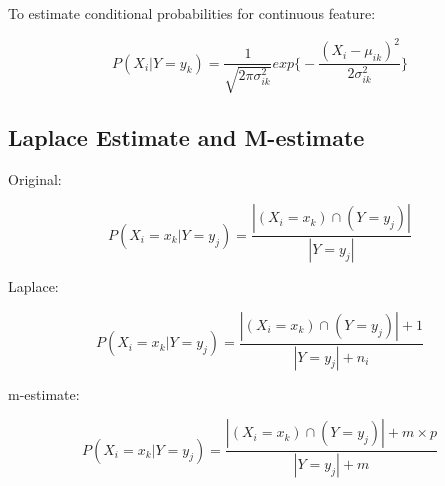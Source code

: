 \begin{multicols}{2}
\noindent To estimate conditional probabilities for continuous feature:

$$P(X_{i}| Y=y_{k}) = \frac{1}{\sqrt{2 \pi \sigma^{2}_{ik}}} exp \bigg\{ - \frac{(X_{i} - \mu_{ik})^{2} }{2 \sigma^{2}_{ik}} \bigg\}$$

\subsection{Laplace Estimate and M-estimate}

\noindent Original:

$$P(X_{i} = x_{k} | Y = y_{j}) = \frac{| (X_{i}=x_{k}) \cap (Y=y_{j}) |}{| Y=y_{j} |}$$

\noindent Laplace:

$$P(X_{i} = x_{k} | Y = y_{j}) = \frac{| (X_{i}=x_{k}) \cap (Y=y_{j}) | + 1}{| Y=y_{j} | + n_{i}}$$

\noindent m-estimate:

$$P(X_{i} = x_{k} | Y = y_{j}) = \frac{| (X_{i}=x_{k}) \cap (Y=y_{j}) |+m\times p}{| Y=y_{j} | + m}$$

\end{multicols}